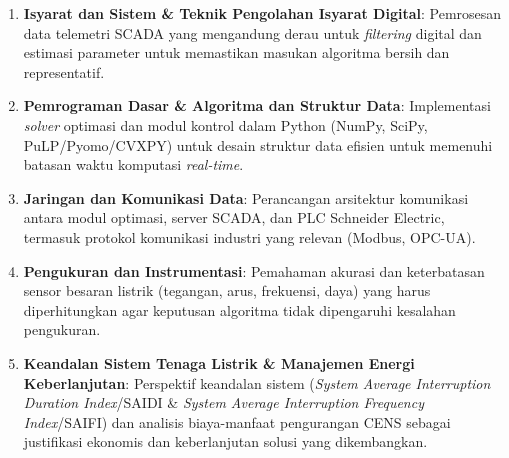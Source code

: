 \begin{enumerate}
    \item[i.] \textbf{Isyarat dan Sistem \& Teknik Pengolahan Isyarat Digital}: Pemrosesan data telemetri SCADA yang mengandung derau untuk \textit{filtering} digital dan estimasi parameter untuk memastikan masukan algoritma bersih dan representatif.
    \item[j.] \textbf{Pemrograman Dasar \& Algoritma dan Struktur Data}: Implementasi \textit{solver} optimasi dan modul kontrol dalam Python (NumPy, SciPy, PuLP/Pyomo/CVXPY) untuk desain struktur data efisien untuk memenuhi batasan waktu komputasi \textit{real-time}.
    \item[k.] \textbf{Jaringan dan Komunikasi Data}: Perancangan arsitektur komunikasi antara modul optimasi, server SCADA, dan PLC Schneider Electric, termasuk protokol komunikasi industri yang relevan (Modbus, OPC-UA).
    \item[l.] \textbf{Pengukuran dan Instrumentasi}: Pemahaman akurasi dan keterbatasan sensor besaran listrik (tegangan, arus, frekuensi, daya) yang harus diperhitungkan agar keputusan algoritma tidak dipengaruhi kesalahan pengukuran.
    \item[m.] \textbf{Keandalan Sistem Tenaga Listrik \& Manajemen Energi Keberlanjutan}: Perspektif keandalan sistem (\textit{System Average Interruption Duration Index}/SAIDI \& \textit{System Average Interruption Frequency Index}/SAIFI) dan analisis biaya-manfaat pengurangan CENS sebagai justifikasi ekonomis dan keberlanjutan solusi yang dikembangkan.
\end{enumerate}